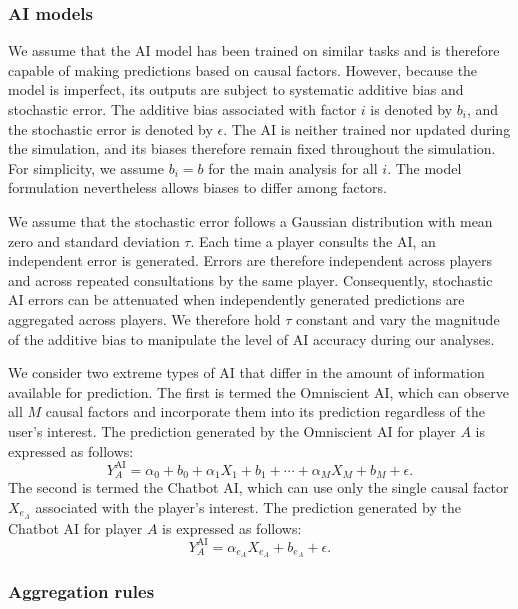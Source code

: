 \documentclass[12pt]{article}
\begin{document}
\subsubsection*{AI models}

We assume that the AI model has been trained on similar tasks and is therefore capable of making predictions based on causal factors. However, because the model is imperfect, its outputs are subject to systematic additive bias and stochastic error. The additive bias associated with factor $i$ is denoted by $b_i$, and the stochastic error is denoted by $\epsilon$. The AI is neither trained nor updated during the simulation, and its biases therefore remain fixed throughout the simulation. 
For simplicity, we assume $b_i = b$ for the main analysis for all $i$.
The model formulation nevertheless allows biases to differ among factors.

We assume that the stochastic error follows a Gaussian distribution with mean zero and standard deviation $\tau$. Each time a player consults the AI, an independent error is generated. Errors are therefore independent across players and across repeated consultations by the same player. Consequently, stochastic AI errors can be attenuated when independently generated predictions are aggregated across players. 
We therefore hold $\tau$ constant and vary the magnitude of the additive bias to manipulate the level of AI accuracy during our analyses.

We consider two extreme types of AI that differ in the amount of information available for prediction. 
The first is termed the Omniscient AI, which can observe all $M$ causal factors and incorporate them into its prediction regardless of the user's interest. 
The prediction generated by the Omniscient AI for player $A$ is expressed as follows:
\begin{equation}
Y_A^{\mathrm{AI}} = \alpha_0 + b_0 + \alpha_1 X_1 + b_1 + \cdots + \alpha_M X_M + b_M + \epsilon.
\end{equation}
The second is termed the Chatbot AI, which can use only the single causal factor $X_{e_A}$ associated with the player's interest. The prediction generated by the Chatbot AI for player $A$ is expressed as follows:
\begin{equation}
Y_A^{\mathrm{AI}} = \alpha_{e_A} X_{e_A} + b_{e_A} + \epsilon.
\end{equation}

\subsubsection*{Aggregation rules}
\end{document}
